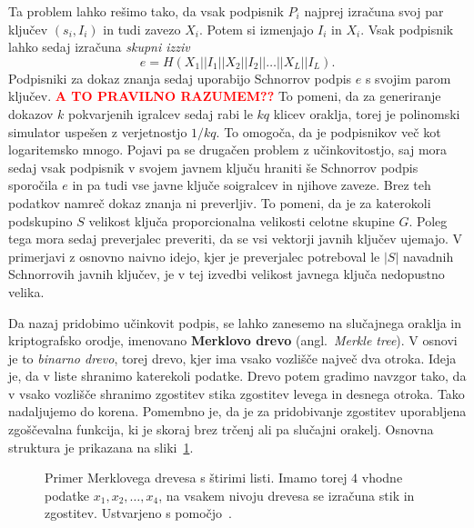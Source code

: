 \documentclass[isrm2, tisk]{fmfdelo}
\newcommand{\todo}[1]{\textcolor{red}{\textbf{\uppercase{#1}??}}}
\begin{document}
Ta problem lahko rešimo tako, da vsak podpisnik $P_i$ najprej izračuna svoj par ključev $(s_i, I_i)$ 
in tudi zavezo $X_i$. Potem si izmenjajo $I_i$ in $X_i$. Vsak podpisnik lahko sedaj izračuna 
\textit{skupni izziv} 
$$ 
e = H(X_1 || I_1 || X_2 || I_2 || \dots || X_L || I_L).
$$
Podpisniki za dokaz znanja sedaj uporabijo Schnorrov podpis $e$ s svojim parom ključev. 
\todo{a to pravilno razumem}
To pomeni, da za generiranje dokazov $k$ pokvarjenih igralcev sedaj rabi le $kq$ klicev oraklja, 
torej je polinomski simulator uspešen z verjetnostjo $1/kq$. To omogoča, da je podpisnikov več 
kot logaritemsko mnogo. Pojavi pa se drugačen problem z učinkovitostjo, saj mora sedaj vsak podpisnik 
v svojem javnem ključu hraniti še Schnorrov podpis sporočila $e$ in pa tudi vse javne ključe 
soigralcev in njihove zaveze. Brez teh podatkov namreč dokaz znanja ni preverljiv. To pomeni, da je 
za katerokoli podskupino $S$ velikost ključa proporcionalna velikosti celotne skupine $G$. Poleg 
tega mora sedaj preverjalec preveriti, da se vsi vektorji javnih ključev ujemajo. V primerjavi 
z osnovno naivno idejo, kjer je preverjalec potreboval le $|S|$ navadnih Schnorrovih javnih ključev, 
je v tej izvedbi velikost javnega ključa nedopustno velika.

Da nazaj pridobimo učinkovit podpis, se lahko zanesemo na slučajnega oraklja in kriptografsko 
orodje, imenovano \textbf{Merklovo drevo} (angl.\ \textit{Merkle tree}). V osnovi je to 
\textit{binarno drevo}, torej drevo, kjer ima vsako vozlišče največ dva otroka. Ideja je, da v liste 
shranimo katerekoli podatke. Drevo potem gradimo navzgor tako, da v vsako vozlišče shranimo zgostitev 
stika zgostitev levega in desnega otroka. Tako nadaljujemo do korena. Pomembno je, da je za pridobivanje 
zgostitev uporabljena zgoščevalna funkcija, ki je skoraj brez trčenj ali pa slučajni orakelj. Osnovna 
struktura je prikazana na sliki~\ref{fig:merkle}.
\begin{figure}[ht]
  \centering
  \caption[Merklovo drevo.]{Primer Merklovega drevesa s štirimi listi. Imamo torej $4$ vhodne podatke
    $x_1, x_2, \dots, x_4$, na vsakem nivoju drevesa se izračuna stik in zgostitev. Ustvarjeno s 
    pomočjo~\cite{SOtikz}.}
  \label{fig:merkle}
\end{figure}
\end{document}
